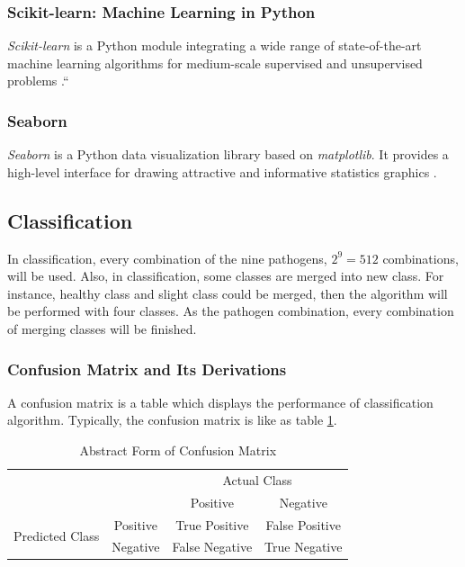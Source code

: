 \documentclass[aps, 11pt, a4paper]{article}
\begin{document}
    		\subsubsection{Scikit-learn: Machine Learning in Python}
    			\textit{Scikit-learn} is a Python module integrating a wide range of state-of-the-art machine learning algorithms for medium-scale supervised and unsupervised problems \cite{ref:sklearn1}.``
    			    			
    		\subsubsection{Seaborn}
		   		\textit{Seaborn} is a Python data visualization library based on \textit{matplotlib}. It provides a high-level interface for drawing attractive and informative statistics graphics \cite{ref:seaborn1}.
		
			\subsection{Classification}
				In classification, every combination of the nine pathogens, $2^9 = 512$ combinations, will be used. Also, in classification, some classes are merged into new class. For instance, healthy class and slight class could be merged, then the algorithm will be performed with four classes. As the pathogen combination, every combination of merging classes will be finished. 
				
				\subsubsection{Confusion Matrix and Its Derivations}
					A confusion matrix is a table which displays the performance of classification algorithm. Typically, the confusion matrix is like as table \ref{tb:confusion}.
					
					\begin{table}[htbp]
						\centering
						\caption{Abstract Form of Confusion Matrix}
						\label{tb:confusion}
						\begin{tabular}{cc|cc}
							\multicolumn{2}{c}{\multirow{2}{*}{}} & \multicolumn{2}{|c}{Actual Class} \\ \cline{3-4} 
							\multicolumn{2}{c|}{} & Positive & Negative \\ \hline
							\multicolumn{1}{c|}{\multirow{2}{*}{Predicted Class}} & Positive & True Positive & False Positive \\
							\multicolumn{1}{c|}{} & Negative & False Negative & True Negative
						\end{tabular}
					\end{table}
					
\end{document}
